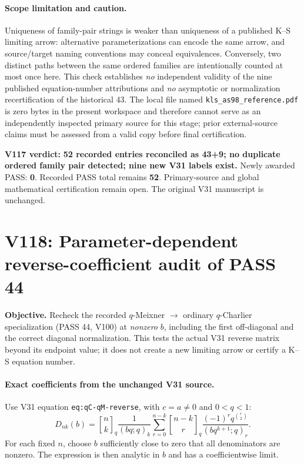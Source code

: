 \documentclass[11pt]{article}
\begin{document}
\paragraph{Scope limitation and caution.} Uniqueness of family-pair strings is weaker than uniqueness of a published K--S limiting arrow: alternative parameterizations can encode the same arrow, and source/target naming conventions may conceal equivalences. Conversely, two distinct paths between the same ordered families are intentionally counted at most once here. This check establishes \emph{no} independent validity of the nine published equation-number attributions and \emph{no} asymptotic or normalization recertification of the historical 43. The local file named \texttt{kls\_as98\_reference.pdf} is zero bytes in the present workspace and therefore cannot serve as an independently inspected primary source for this stage; prior external-source claims must be assessed from a valid copy before final certification.

\noindent\textbf{V117 verdict:} \textbf{52 recorded entries reconciled as 43+9; no duplicate ordered family pair detected; nine new V31 labels exist.} Newly awarded PASS: \textbf{0}. Recorded PASS total remains \textbf{52}. Primary-source and global mathematical certification remain open. The original V31 manuscript is unchanged.


\clearpage
\section{V118: Parameter-dependent reverse-coefficient audit of PASS 44}
\noindent\textbf{Objective.} Recheck the recorded $q$-Meixner $\to$ ordinary $q$-Charlier specialization (PASS 44, V100) at \emph{nonzero} $b$, including the first off-diagonal and the correct diagonal normalization. This tests the actual V31 reverse matrix beyond its endpoint value; it does not create a new limiting arrow or certify a K--S equation number.

\paragraph{Exact coefficients from the unchanged V31 source.}
Use V31 equation \texttt{eq:qC-qM-reverse}, with $c=a\ne0$ and $0<q<1$:
\begin{equation}\label{eq:v118-D}
 D_{nk}(b)={n\brack k}_q\frac{1}{(bq;q)_k}
 \sum_{r=0}^{n-k}{n-k\brack r}_q
 \frac{(-1)^r q^{\binom r2}}{(bq^{k+1};q)_r}.
\end{equation}
For each fixed $n$, choose $b$ sufficiently close to zero that all denominators are nonzero. The expression is then analytic in $b$ and has a coefficientwise limit.
\end{document}
